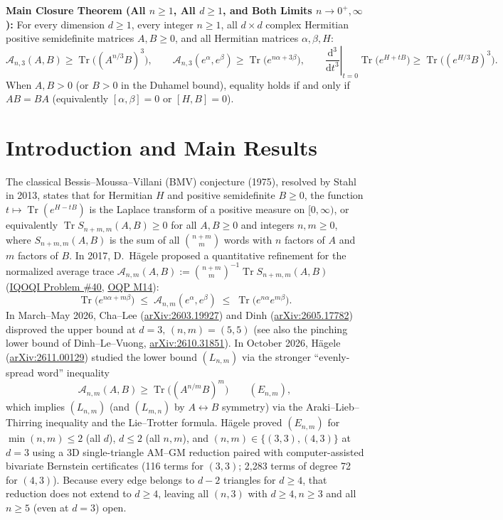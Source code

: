 \documentclass[11pt,a4paper]{article}
\theoremstyle{remark}
\newcommand{\Tr}{\operatorname{Tr}}
\newcommand{\takeaway}[2]{%
  \vspace{5pt}\noindent\colorbox{primary!8}{%
    \parbox{\dimexpr\linewidth-2\fboxsep\relax}{%
      \vspace{4pt}\textbf{\color{primary}#1:}\hspace{0.4em}#2\vspace{4pt}%
    }%
  }\vspace{5pt}%
}
\begin{document}
\takeaway{Main Closure Theorem (All $n \ge 1$, All $d \ge 1$, and Both Limits $n\to 0^+, \infty$)}{
For every dimension $d\ge 1$, every integer $n\ge 1$, all $d\times d$ complex Hermitian positive semidefinite matrices $A,B\ge 0$, and all Hermitian matrices $\alpha,\beta,H$:
\[
\mathcal{A}_{n,3}(A,B)\ge\Tr\!\big((A^{n/3}B)^3\big),\qquad
\mathcal{A}_{n,3}(e^\alpha,e^\beta)\ge\Tr\!\big(e^{n\alpha+3\beta}\big),\qquad
\left.\frac{\mathrm{d}^3}{\mathrm{d}t^3}\right|_{t=0}\Tr\!\big(e^{H+tB}\big)\ge\Tr\!\big((e^{H/3}B)^3\big).
\]
When $A,B>0$ (or $B>0$ in the Duhamel bound), equality holds if and only if $AB=BA$ (equivalently $[\alpha,\beta]=0$ or $[H,B]=0$).}

\section{Introduction and Main Results}

The classical Bessis--Moussa--Villani (BMV) conjecture (1975), resolved by Stahl in 2013, states that for Hermitian $H$ and positive semidefinite $B\ge 0$, the function $t\mapsto \Tr(e^{H-tB})$ is the Laplace transform of a positive measure on $[0,\infty)$, or equivalently $\Tr S_{n+m,m}(A,B)\ge 0$ for all $A,B\ge 0$ and integers $n,m\ge 0$, where $S_{n+m,m}(A,B)$ is the sum of all $\binom{n+m}{m}$ words with $n$ factors of $A$ and $m$ factors of $B$. In 2017, D.~H\"agele proposed a quantitative refinement for the normalized average trace $\mathcal{A}_{n,m}(A,B):=\binom{n+m}{m}^{-1}\Tr S_{n+m,m}(A,B)$ (\href{https://oqp.iqoqi.oeaw.ac.at/open-quantum-problems}{IQOQI Problem \#40}, \href{https://openquantumproblems.com/p/M14}{OQP M14}):
\[
\Tr\!\big(e^{n\alpha+m\beta}\big)\;\le\;\mathcal{A}_{n,m}(e^\alpha,e^\beta)\;\le\;\Tr\!\big(e^{n\alpha}e^{m\beta}\big).
\]
In March--May 2026, Cha--Lee (\href{https://arxiv.org/abs/2603.19927}{arXiv:2603.19927}) and Dinh (\href{https://arxiv.org/html/2605.17782v1}{arXiv:2605.17782}) disproved the upper bound at $d=3,\,(n,m)=(5,5)$ (see also the pinching lower bound of Dinh--Le--Vuong, \href{https://arxiv.org/html/2610.31851v1}{arXiv:2610.31851}). In October 2026, H\"agele (\href{https://arxiv.org/html/2611.00129v1}{arXiv:2611.00129}) studied the lower bound $(L_{n,m})$ via the stronger ``evenly-spread word'' inequality
\begin{equation}\label{eq:Enm}
  \mathcal{A}_{n,m}(A,B) \ge \Tr\!\big((A^{n/m}B)^m\big) \qquad (E_{n,m}),
\end{equation}
which implies $(L_{n,m})$ (and $(L_{m,n})$ by $A\leftrightarrow B$ symmetry) via the Araki--Lieb--Thirring inequality and the Lie--Trotter formula. H\"agele proved $(E_{n,m})$ for $\min(n,m)\le 2$ (all $d$), $d\le 2$ (all $n,m$), and $(n,m)\in\{(3,3),(4,3)\}$ at $d=3$ using a 3D single-triangle AM--GM reduction paired with computer-assisted bivariate Bernstein certificates (116 terms for $(3,3)$; 2,283 terms of degree 72 for $(4,3)$). Because every edge belongs to $d-2$ triangles for $d\ge 4$, that reduction does not extend to $d\ge 4$, leaving all $(n,3)$ with $d\ge 4, n\ge 3$ and all $n\ge 5$ (even at $d=3$) open.
\end{document}
